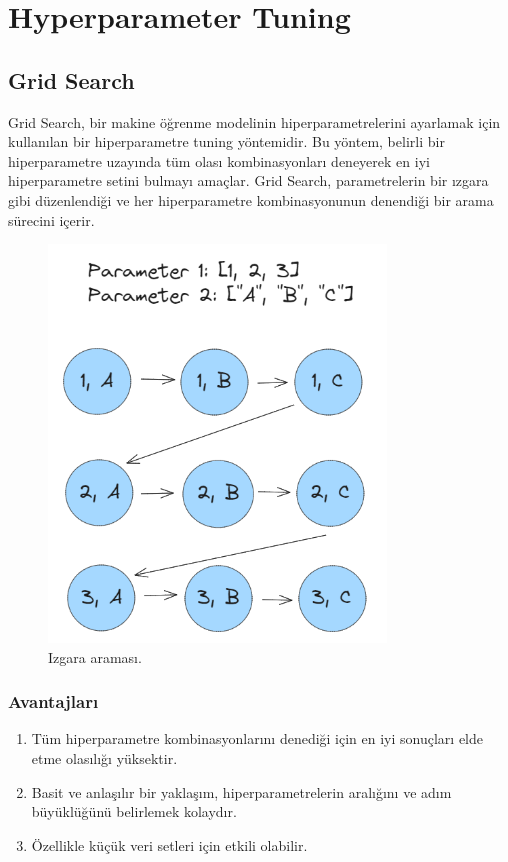 \section{Hyperparameter Tuning}
\subsection{Grid Search}
Grid Search, bir makine öğrenme modelinin hiperparametrelerini ayarlamak için kullanılan bir hiperparametre tuning yöntemidir. Bu yöntem, belirli bir hiperparametre uzayında tüm olası kombinasyonları deneyerek en iyi hiperparametre setini bulmayı amaçlar. Grid Search, parametrelerin bir ızgara gibi düzenlendiği ve her hiperparametre kombinasyonunun denendiği bir arama sürecini içerir.

\begin{figure}[h]
    \centering
    \includegraphics[width=0.8\textwidth]{images/Grid_Search.png}
    \caption{Izgara araması.}
    \label{fig:enter-label}
\end{figure}

\subsubsection{Avantajları}
\begin{enumerate}
    \item Tüm hiperparametre kombinasyonlarını denediği için en iyi sonuçları elde etme olasılığı yüksektir.
    \item Basit ve anlaşılır bir yaklaşım, hiperparametrelerin aralığını ve adım büyüklüğünü belirlemek kolaydır.
    \item Özellikle küçük veri setleri için etkili olabilir.
\end{enumerate}

